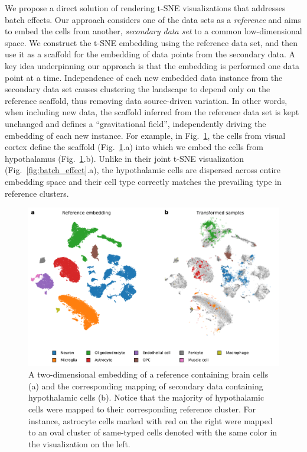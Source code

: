 \documentclass[runningheads]{llncs}
\begin{document}
We propose a direct solution of rendering t-SNE visualizations that addresses
batch effects. Our approach considers one of the data sets as a {\em reference}
and aims to embed the cells from another, {\em secondary data set} to a common low-dimensional space.
We construct the t\nobreakdash -SNE embedding using the reference data set, and then use it
as a scaffold for the embedding of data points from the secondary data.
A key idea underpinning our approach is that the embedding is performed one data point at a time.
Independence of each new
embedded data instance from the secondary data set causes clustering the landscape
to depend only on the reference scaffold, thus removing data source-driven
variation. In other words, when including new data, the scaffold inferred from
the reference data set is kept unchanged and defines a ``gravitational
field'', independently driving the embedding of each new instance. For example, in
Fig.~\ref{fig:transform_brain}, the cells from visual cortex define the
scaffold (Fig.~\ref{fig:transform_brain}.a) into which we embed the cells from
hypothalamus (Fig.~\ref{fig:transform_brain}.b). Unlike in their joint t\nobreakdash -SNE
visualization (Fig.~\ref{fig:batch_effect}.a), the hypothalamic cells are
dispersed across entire embedding space and their cell type correctly matches
the prevailing type in reference clusters.

\begin{figure}[htb]
\includegraphics[width=\textwidth]{figures/transform_brain.pdf}
\caption{A two-dimensional embedding of a reference containing brain cells (a) and
the corresponding mapping of secondary data containing hypothalamic cells (b). Notice
that the majority of hypothalamic cells were mapped to their corresponding
reference cluster. For instance, astrocyte cells marked with red on the
right were mapped to an oval cluster of same-typed cells denoted with the same
color in the visualization on the left.} \label{fig:transform_brain}
\end{figure}
\end{document}

